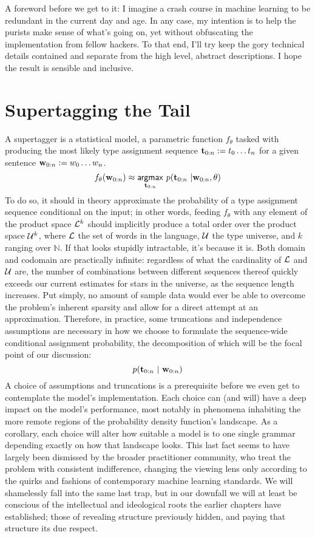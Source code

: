 A foreword before we get to it: I imagine a crash course in machine learning to be redundant in the current day and age.
In any case, my intention is to help the purists make sense of what's going on, yet without obfuscating the implementation from fellow hackers.
To that end, I'll try keep the gory technical details contained and separate from the high level, abstract descriptions.
I hope the result is sensible and inclusive.


\section{Supertagging the Tail}
A supertagger is a statistical model, a parametric function $f_\theta$ tasked with producing the most likely type assignment sequence $\mathbf{t}_{0:n} := t_0 \dots t_n$ for a given sentence $\mathbf{w}_{0:n} := w_0 \dots w_n$.
\begin{equation}
	f_\theta(\mathbf{w}_{0:n}) \approx \underset{\mathbf{t}_{0:n}}{\mathsf{argmax}} ~ p(\mathbf{t}_{0:n} \ | \mathbf{w}_{0:n}, \theta)
\end{equation}
To do so, it should in theory approximate the probability of a type assignment sequence conditional on the input; in other words, feeding $f_\theta$ with any element of the product space $\mathcal{L}^k$ should implicitly produce a total order over the product space $\mathcal{U}^{k}$, where $\mathcal{L}$ the set of words in the language, $\mathcal{U}$ the type universe, and $k$ ranging over $\mathbb{N}$.
If that looks stupidly intractable, it's because it is.
Both domain and codomain are practically infinite: regardless of what the cardinality of $\mathcal{L}$ and $\mathcal{U}$ are, the number of combinations between different sequences thereof quickly exceeds our current estimates for stars in the universe, as the sequence length increases.
Put simply, no amount of sample data would ever be able to overcome the problem's inherent sparsity and allow for a direct attempt at an approximation.
Therefore, in practice, some truncations and independence assumptions are necessary in how we choose to formulate the sequence-wide conditional assignment probability, the decomposition of which will be the focal point of our discussion:
\begin{equation}\label{equation:supertag}
p(\mathbf{t}_{0:n} \ | \ \mathbf{w}_{0:n})
\end{equation}
A choice of assumptions and truncations is a prerequisite before we even get to contemplate the model's implementation.
Each choice can (and will) have a deep impact on the model's performance, most notably in phenomena inhabiting the more remote regions of the probability density function's landscape.
As a corollary, each choice will alter how suitable a model is to one single grammar depending exactly on how that landscape looks.
This last fact seems to have largely been dismissed by the broader practitioner community, who treat the problem with consistent indifference, changing the viewing lens only according to the quirks and fashions of contemporary machine learning standards.
We will shamelessly fall into the same last trap, but in our downfall we will at least be conscious of the intellectual and ideological roots the earlier chapters have established; those of revealing structure previously hidden, and paying that structure its due respect.


